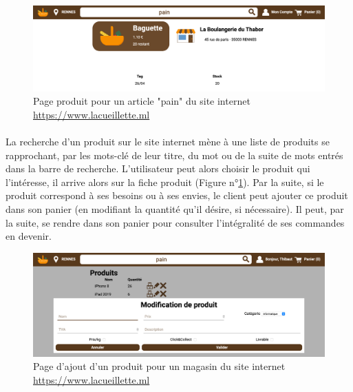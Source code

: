 \documentclass[a4paper, 12pt]{article}
\begin{document}
\begin{figure}[H]
	\begin{center}
		\includegraphics[width=12cm]{fig/product.png}
		\caption[Page produit pour un article "pain" du site internet]{Page produit pour un article "pain" du site internet \url{https://www.lacueillette.ml}}
		\label{fig:product}
	\end{center}
\end{figure}

\paragraph{}La recherche d’un produit sur le site internet mène à une liste de produits se rapprochant, par les mots-clé de leur titre, du mot ou de la suite de mots entrés dans la barre de recherche. L’utilisateur peut alors choisir le produit qui l’intéresse, il arrive alors sur la fiche produit (Figure n°\ref{fig:product}). Par la suite, si le produit correspond à ses besoins ou à ses envies, le client peut ajouter ce produit dans son panier (en modifiant la quantité qu’il désire, si nécessaire). Il peut, par la suite, se rendre dans son panier pour consulter l’intégralité de ses commandes en devenir.

\begin{figure}[H]
	\begin{center}
		\includegraphics[width=12cm]{fig/add-product.png}
		\caption[Page d'ajout d'un produit pour un magasin du site internet]{Page d'ajout d'un produit pour un magasin du site internet \url{https://www.lacueillette.ml}}
		\label{fig:add-product}
	\end{center}
\end{figure}
\end{document}
